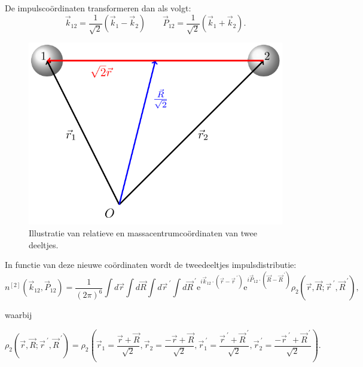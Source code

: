 \documentclass[11pt,twoside]{book}
\begin{document}
De impulsco\"{o}rdinaten transformeren dan als volgt:
\begin{equation} \label{eq:rcm_impusl}
\vec{k}_{12}= \frac{1}{\sqrt{2}} \left(\vec{k}_1 - \vec{k}_2\right) \qquad \vec{P}_{12}= \frac{1}{\sqrt{2}} \left(\vec{k}_1 + \vec{k}_2\right).
\end{equation}
\begin{figure}[H]
\centering
\includegraphics[scale=0.7]{./figuren/jacobi.pdf}
\caption{ Illustratie van relatieve en massacentrumco\"{o}rdinaten van twee deeltjes.}
\label{fig:coordinates}
\end{figure}
In functie van deze nieuwe co\"{o}rdinaten wordt de tweedeeltjes impulsdistributie:
\begin{equation} \label{eq:twobodydist}
n^{[2]}(\vec{k}_{12},\vec{P}_{12})=\frac{1}{(2\pi)^6}
						\int d\vec{r} \int d\vec{R} \int d\vec{r}^{\ \prime} \int d\vec{R}^{\ \prime} 
    						\mathrm{e}^{i\vec{k}_{12}\cdot (\vec{r}-\vec{r}^{\ \prime})} 
    						\mathrm{e}^{i\vec{P}_{12}\cdot(\vec{R}-\vec{R}^{\ \prime})} 
    						\rho_2(\vec{r},\vec{R}; \vec{r}^{\ \prime},\vec{R}^{\ \prime}),
\end{equation}

waarbij

\begin{equation} \label{eq:twobodydensity}
\rho_2(\vec{r},\vec{R}; \vec{r}^{\ \prime},\vec{R}^{\ \prime}) = 
							\rho_2\left(	
							\vec{r}_1=\frac{\vec{r} + \vec{R}}{\sqrt{2}},
							\vec{r}_2=\frac{-\vec{r} + \vec{R}}{\sqrt{2}},
						    \vec{r}_1^{\ \prime}=\frac{\vec{r}^{\ \prime} + \vec{R}^{\ \prime}}{\sqrt{2}},	
						    \vec{r}_2^{\ \prime}=\frac{-\vec{r}^{\ \prime} + \vec{R}^{\ \prime}}{\sqrt{2}}
						    \right).
\end{equation}
\end{document}
